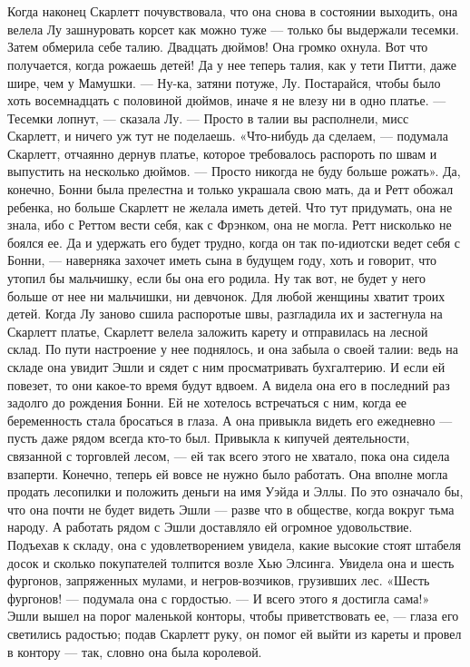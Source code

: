 \chapter{\ }

Когда наконец Скарлетт почувствовала, что она снова в состоянии выходить, она велела Лу зашнуровать корсет как можно туже — только бы выдержали тесемки. Затем обмерила себе талию. Двадцать дюймов! Она громко охнула. Вот что получается, когда рожаешь детей! Да у нее теперь талия, как у тети Питти, даже шире, чем у Мамушки.
— Ну-ка, затяни потуже, Лу. Постарайся, чтобы было хоть восемнадцать с половиной дюймов, иначе я не влезу ни в одно платье.
— Тесемки лопнут, — сказала Лу. — Просто в талии вы располнели, мисс Скарлетт, и ничего уж тут не поделаешь.
«Что-нибудь да сделаем, — подумала Скарлетт, отчаянно дернув платье, которое требовалось распороть по швам и выпустить на несколько дюймов. — Просто никогда не буду больше рожать».
Да, конечно, Бонни была прелестна и только украшала свою мать, да и Ретт обожал ребенка, но больше Скарлетт не желала иметь детей. Что тут придумать, она не знала, ибо с Реттом вести себя, как с Фрэнком, она не могла. Ретт нисколько не боялся ее. Да и удержать его будет трудно, когда он так по-идиотски ведет себя с Бонни, — наверняка захочет иметь сына в будущем году, хоть и говорит, что утопил бы мальчишку, если бы она его родила. Ну так вот, не будет у него больше от нее ни мальчишки, ни девчонок. Для любой женщины хватит троих детей.
Когда Лу заново сшила распоротые швы, разгладила их и застегнула на Скарлетт платье, Скарлетт велела заложить карету и отправилась на лесной склад. По пути настроение у нее поднялось, и она забыла о своей талии: ведь на складе она увидит Эшли и сядет с ним просматривать бухгалтерию. И если ей повезет, то они какое-то время будут вдвоем. А видела она его в последний раз задолго до рождения Бонни. Ей не хотелось встречаться с ним, когда ее беременность стала бросаться в глаза. А она привыкла видеть его ежедневно — пусть даже рядом всегда кто-то был. Привыкла к кипучей деятельности, связанной с торговлей лесом, — ей так всего этого не хватало, пока она сидела взаперти. Конечно, теперь ей вовсе не нужно было работать. Она вполне могла продать лесопилки и положить деньги на имя Уэйда и Эллы. По это означало бы, что она почти не будет видеть Эшли — разве что в обществе, когда вокруг тьма народу. А работать рядом с Эшли доставляло ей огромное удовольствие.
Подъехав к складу, она с удовлетворением увидела, какие высокие стоят штабеля досок и сколько покупателей толпится возле Хью Элсинга. Увидела она и шесть фургонов, запряженных мулами, и негров-возчиков, грузивших лес. «Шесть фургонов! — подумала она с гордостью. — И всего этого я достигла сама!» Эшли вышел на порог маленькой конторы, чтобы приветствовать ее, — глаза его светились радостью; подав Скарлетт руку, он помог ей выйти из кареты и провел в контору — так, словно она была королевой.
